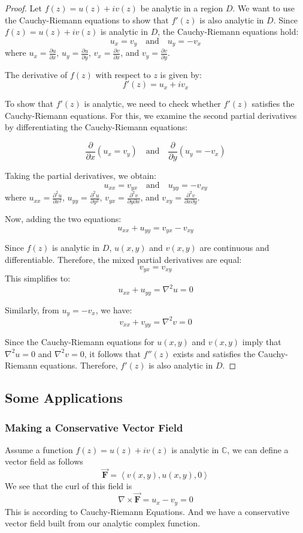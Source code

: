 \documentclass[12pt]{book}
\newcommand{\C}{\mathbb{C}}
\newcommand{\curl}{\nabla \times}
\newcommand{\tribkt}[1]{\left< #1 \right>}
\begin{document}
\begin{proof}
Let \( f(z) = u(z) + iv(z) \) be analytic in a region \( D \). We want to use the Cauchy-Riemann equations to show that \( f'(z) \) is also analytic in \( D \).
Since \( f(z) = u(z) + iv(z) \) is analytic in \( D \), the Cauchy-Riemann equations hold:
\[
u_x = v_y \quad \text{and} \quad u_y = -v_x
\]
where \( u_x = \frac{\partial u}{\partial x} \), \( u_y = \frac{\partial u}{\partial y} \), \( v_x = \frac{\partial v}{\partial x} \), and \( v_y = \frac{\partial v}{\partial y} \).

The derivative of \( f(z) \) with respect to \( z \) is given by:
\[
f'(z) = u_x + iv_x
\]

To show that \( f'(z) \) is analytic, we need to check whether \( f'(z) \) satisfies the Cauchy-Riemann equations. For this, we examine the second partial derivatives by differentiating the Cauchy-Riemann equations:

\[
\frac{\partial}{\partial x} (u_x = v_y) \quad \text{and} \quad \frac{\partial}{\partial y} (u_y = -v_x)
\]

Taking the partial derivatives, we obtain:
\[
u_{xx} = v_{yx} \quad \text{and} \quad u_{yy} = -v_{xy}
\]
where \( u_{xx} = \frac{\partial^2 u}{\partial x^2} \), \( u_{yy} = \frac{\partial^2 u}{\partial y^2} \), \( v_{yx} = \frac{\partial^2 v}{\partial y \partial x} \), and \( v_{xy} = \frac{\partial^2 v}{\partial x \partial y} \).

Now, adding the two equations:
\[
u_{xx} + u_{yy} = v_{yx} - v_{xy}
\]

Since \( f(z) \) is analytic in \( D \), \( u(x,y) \) and \( v(x,y) \) are continuous and differentiable. Therefore, the mixed partial derivatives are equal:
\[
v_{yx} = v_{xy}
\]
This simplifies to:
\[
u_{xx} + u_{yy} = \nabla^2 u = 0
\]

Similarly, from \( u_y = -v_x \), we have:
\[
v_{xx} + v_{yy} = \nabla^2 v = 0
\]

Since the Cauchy-Riemann equations for \( u(x,y) \) and \( v(x,y) \) imply that \( \nabla^2 u = 0 \) and \( \nabla^2 v = 0 \), it follows that \( f''(z) \) exists and satisfies the Cauchy-Riemann equations. Therefore, \( f'(z) \) is also analytic in \( D \).
\end{proof}
\subsection{Some Applications}
\subsubsection{Making a Conservative Vector Field}
Assume a function $f(z) = u(z)+iv(z)$ is analytic in $\C$, we can define a vector field as follows
\[
\Vec{\mathbf{F}} = \tribkt{v(x,y),u(x,y),0}
\]
We see that the curl of this field is 
\[
\curl \Vec{\mathbf{F}} = u_x - v_y = 0
\]
This is according to Cauchy-Riemann Equations. And we have a conservative vector field built from our analytic complex function. 
\end{document}
